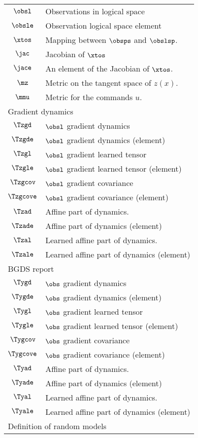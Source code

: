 \begin{longtable}{cl}
 $\obsl$ &  Observations in logical space\\ 
 $\obsle$ &  Observation logical space element\\ 
 $\xtos$ &  Mapping between $\obsps$ and $\obslsp$.\\ 
 $\jac$ &  Jacobian of $\xtos$\\ 
 $\jace$ &  An element of the Jacobian of $\xtos$.\\ 
 $\mz$ &  Metric on the tangent space of $z(x)$.\\ 
 $\mmu$ &  Metric for the commands $u$. \\ 
 \multicolumn{2}{l}{Gradient dynamics}\\ 
 \hline
$\Tzgd$ &  $\obsl$  gradient dynamics\\ 
 $\Tzgde$ &  $\obsl$  gradient dynamics (element)\\ 
 $\Tzgl$ &  $\obsl$  gradient  learned tensor \\ 
 $\Tzgle$ &  $\obsl$  gradient  learned tensor (element)\\ 
 $\Tzgcov$ &  $\obsl$  gradient  covariance\\ 
 $\Tzgcove$ &  $\obsl$  gradient  covariance (element)\\ 
 $\Tzad$ &  Affine part of dynamics.\\ 
 $\Tzade$ &  Affine part of dynamics (element)\\ 
 $\Tzal$ &  Learned affine part of dynamics.\\ 
 $\Tzale$ &  Learned affine part of dynamics (element)\\ 
 \multicolumn{2}{l}{BGDS report}\\ 
 \hline
$\Tygd$ &  $\obs$ gradient dynamics\\ 
 $\Tygde$ &  $\obs$ gradient dynamics (element)\\ 
 $\Tygl$ &  $\obs$ gradient learned tensor \\ 
 $\Tygle$ &  $\obs$ gradient learned tensor (element)\\ 
 $\Tygcov$ &  $\obs$ gradient covariance\\ 
 $\Tygcove$ &  $\obs$ gradient covariance (element)\\ 
 $\Tyad$ &  Affine part of dynamics.\\ 
 $\Tyade$ &  Affine part of dynamics (element)\\ 
 $\Tyal$ &  Learned affine part of dynamics.\\ 
 $\Tyale$ &  Learned affine part of dynamics (element)\\ 
 \multicolumn{2}{l}{Definition of random models}\\ 

\end{longtable}
